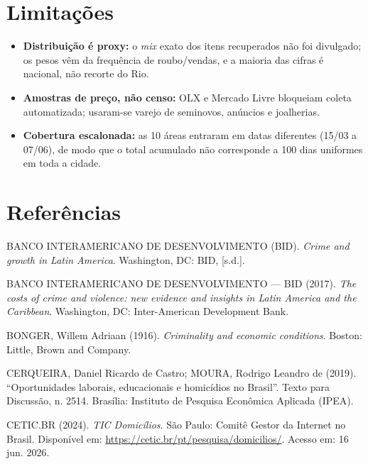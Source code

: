 \documentclass[11pt,a4paper]{article}
\begin{document}
\section*{Limitações}
\begin{itemize}\setlength\itemsep{0.1em}
  \item \textbf{Distribuição é proxy:} o \emph{mix} exato dos itens recuperados não foi divulgado;
        os pesos vêm da frequência de roubo/vendas, e a maioria das cifras é nacional, não recorte
        do Rio.
  \item \textbf{Amostras de preço, não censo:} OLX e Mercado Livre bloqueiam coleta automatizada;
        usaram-se varejo de seminovos, anúncios e joalherias.
  \item \textbf{Cobertura escalonada:} as 10 áreas entraram em datas diferentes (15/03 a 07/06), de
        modo que o total acumulado não corresponde a 100 dias uniformes em toda a cidade.
\end{itemize}

\section*{Referências}
\begingroup\small\setlength{\parindent}{0pt}\setlength{\parskip}{3pt}

BANCO INTERAMERICANO DE DESENVOLVIMENTO (BID). \emph{Crime and growth in Latin America}. Washington, DC: BID, [s.d.].

BANCO INTERAMERICANO DE DESENVOLVIMENTO --- BID (2017). \emph{The costs of crime and violence: new evidence and insights in Latin America and the Caribbean}. Washington, DC: Inter-American Development Bank.

BONGER, Willem Adriaan (1916). \emph{Criminality and economic conditions}. Boston: Little, Brown and Company.

CERQUEIRA, Daniel Ricardo de Castro; MOURA, Rodrigo Leandro de (2019). ``Oportunidades laborais, educacionais e homicídios no Brasil''. Texto para Discussão, n. 2514. Brasília: Instituto de Pesquisa Econômica Aplicada (IPEA).

CETIC.BR (2024). \emph{TIC Domicílios}. São Paulo: Comitê Gestor da Internet no Brasil. Disponível em: \url{https://cetic.br/pt/pesquisa/domicilios/}. Acesso em: 16 jun. 2026.
\end{document}
